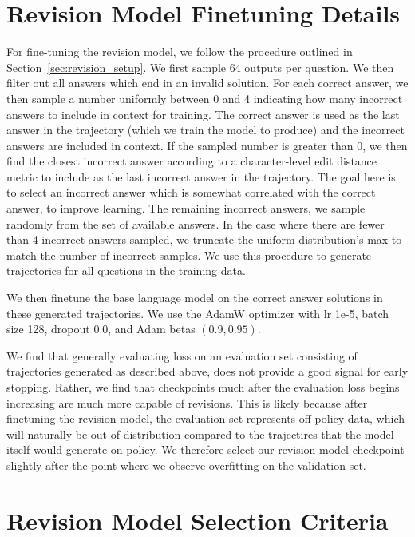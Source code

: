 \documentclass[11pt, letterpaper, logo]{googledeepmind}
\begin{document}
\section{Revision Model Finetuning Details}
\label{app:revision_finetune}

For fine-tuning the revision model, we follow the procedure outlined in Section~\ref{sec:revision_setup}. We first sample 64 outputs per question. We then filter out all answers which end in an invalid solution. For each correct answer, we then sample a number uniformly between 0 and 4 indicating how many incorrect answers to include in context for training. The correct answer is used as the last answer in the trajectory (which we train the model to produce) and the incorrect answers are included in context. If the sampled number is greater than 0, we then find the closest incorrect answer according to a character-level edit distance metric to include as the last incorrect answer in the trajectory. The goal here is to select an incorrect answer which is somewhat correlated with the correct answer, to improve learning. The remaining incorrect answers, we sample randomly from the set of available answers. In the case where there are fewer than 4 incorrect answers sampled, we truncate the uniform distribution's max to match the number of incorrect samples. We use this procedure to generate trajectories for all questions in the training data.

We then finetune the base language model on the correct answer solutions in these generated trajectories. We use the AdamW optimizer with lr 1e-5, batch size 128, dropout 0.0, and Adam betas $(0.9, 0.95)$.

We find that generally evaluating loss on an evaluation set consisting of trajectories generated as described above, does not provide a good signal for early stopping. Rather, we find that checkpoints much after the evaluation loss begins increasing are much more capable of revisions. This is likely because after finetuning the revision model, the evaluation set represents off-policy data, which will naturally be out-of-distribution compared to the trajectires that the model itself would generate on-policy. We therefore select our revision model checkpoint slightly after the point where we observe overfitting on the validation set.

\section{Revision Model Selection Criteria}
\label{app:revision_selection}
\end{document}
